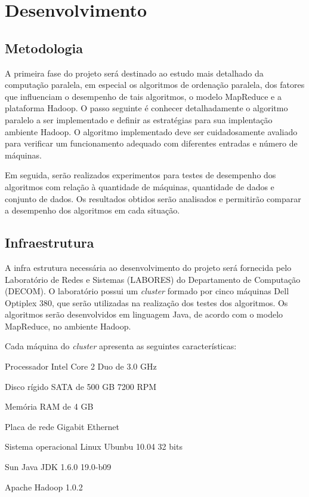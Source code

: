 \chapter{Desenvolvimento}
\label{cap:desenvolvimento}

\section{Metodologia}

A primeira fase do projeto será destinado ao estudo mais detalhado da computação paralela, em especial os algoritmos de ordenação paralela, dos fatores que influenciam o desempenho de tais algoritmos, o modelo MapReduce e a plataforma Hadoop. O passo seguinte é conhecer detalhadamente o algoritmo paralelo a ser implementado e definir as estratégias para sua implentação ambiente Hadoop. 
O algoritmo implementado deve ser cuidadosamente avaliado para verificar um funcionamento adequado com diferentes entradas e número de máquinas. 

Em seguida, serão realizados experimentos para testes de desempenho dos algoritmos com relação à quantidade de máquinas, quantidade de dados e conjunto de dados.  Os resultados obtidos serão analisados e permitirão comparar a desempenho dos algoritmos em cada situação. 


\section{Infraestrutura}

A infra estrutura necessária ao desenvolvimento do projeto será fornecida pelo Laboratório de Redes e Sistemas (LABORES) do Departamento de Computação (DECOM). O laboratório possui um \textit{cluster} formado por cinco máquinas Dell Optiplex 380, que serão utilizadas na realização dos testes dos algoritmos. Os algoritmos serão desenvolvidos em linguagem Java, de acordo com o modelo MapReduce, no ambiente Hadoop. 

Cada máquina do \textit{cluster} apresenta as seguintes características:
\begin{packed_enum}
\item Processador Intel Core 2 Duo de 3.0 GHz
\item Disco rígido SATA de 500 GB 7200 RPM
\item Memória RAM de 4 GB
\item Placa de rede Gigabit Ethernet
\item Sistema operacional Linux Ubunbu 10.04 32 bits %
\item Sun Java JDK 1.6.0 19.0-b09 
\item Apache Hadoop 1.0.2
\end{packed_enum}


